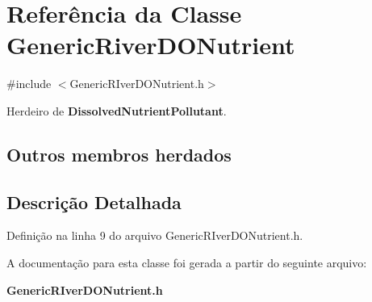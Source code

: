 \section{Referência da Classe Generic\+River\+D\+O\+Nutrient}
\label{class_generic_river_d_o_nutrient}


{\ttfamily \#include $<$Generic\+R\+Iver\+D\+O\+Nutrient.\+h$>$}



Herdeiro de {\bf Dissolved\+Nutrient\+Pollutant}.

\subsection*{Outros membros herdados}


\subsection{Descrição Detalhada}


Definição na linha 9 do arquivo Generic\+R\+Iver\+D\+O\+Nutrient.\+h.



A documentação para esta classe foi gerada a partir do seguinte arquivo\+:\begin{DoxyCompactItemize}
\item 
{\bf Generic\+R\+Iver\+D\+O\+Nutrient.\+h}\end{DoxyCompactItemize}
